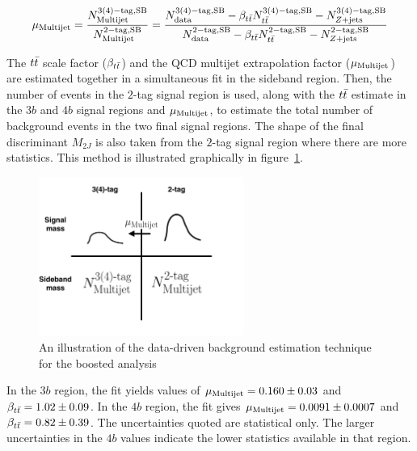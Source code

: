 \begin{equation}
\label{eqn:4bmu}
\mu_{\rm Multijet} = \frac{N_{\rm Multijet}^{\rm 3(4)-tag, SB}}{N_{\rm Multijet}^{\rm 2-tag, SB}} = \frac{N_{\rm data}^{\rm 3(4)-tag, SB} - \beta_{t\bar{t}} N_{t\bar{t}}^{\rm 3(4)-tag, SB} - N_{Z+ \rm jets}^{\rm 3(4)-tag, SB}}{N_{\rm data}^{\rm 2-tag, SB} - \beta_{t\bar{t}} N_{t\bar{t}}^{\rm 2-tag, SB} - N_{Z+ \rm jets}^{\rm 2-tag, SB}}
\end{equation}

The $t\bar{t}$ scale factor ($\beta_{t\bar{t}}$) and the QCD multijet extrapolation factor ($\mu_{\rm Multijet}$) are estimated together in a simultaneous fit in the sideband region. Then, the number of events in the $2$-tag signal region is used, along with the $t\bar{t}$ estimate in the $3b$ and $4b$ signal regions and $\mu_{\rm Multijet}$, to estimate the total number of background events in the two final signal regions. The shape of the final discriminant $M_{2J}$ is also taken from the $2$-tag signal region where there are more statistics. This method is illustrated graphically in figure~\ref{fig:4b_bkg_cartoon}.

\begin{figure}[h!]
  \centering
  \captionsetup{justification=centering}

  \includegraphics[width=0.6\textwidth]{figures/4b_bkg_cartoon}
  \caption{An illustration of the data-driven background estimation technique for the boosted analysis}
  \label{fig:4b_bkg_cartoon}
\end{figure}

In the $3b$ region, the fit yields values of $\mu_{\rm Multijet} = 0.160 \pm 0.03$ and $\beta_{t\bar{t}} = 1.02 \pm 0.09$. In the $4b$ region, the fit gives $\mu_{\rm Multijet} = 0.0091 \pm 0.0007$ and $\beta_{t\bar{t}} = 0.82 \pm 0.39$. The uncertainties quoted are statistical only. The larger uncertainties in the $4b$ values indicate the lower statistics available in that region. 

